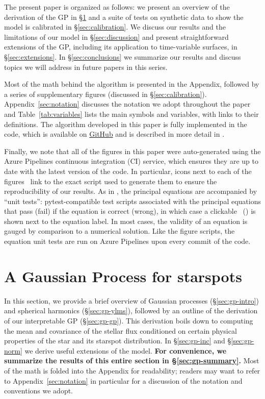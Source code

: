 \documentclass[modern,linenumbers]{aastex62}
\begin{document}
\vspace{1em}

The present paper is organized as follows:
we present an overview of the derivation of the GP in \S\ref{sec:gp}
and a suite of tests on synthetic data to show the model is calibrated
in \S\ref{sec:calibration}. We discuss our results and the limitations
of our model in \S\ref{sec:discussion} and present straightforward
extensions of the GP, including its application to time-variable
surfaces, in \S\ref{sec:extensions}.
In \S\ref{sec:conclusions} we summarize our results and discuss
topics we will address in future papers in this series.


Most of the math behind the algorithm
is presented in the Appendix, followed by a series of supplementary figures
(discussed in \S\ref{sec:calibration}). Appendix~\ref{sec:notation} discusses the
notation we adopt throughout the paper and Table~\ref{tab:variables}
lists the main symbols and variables, with links to their definitions.
The algorithm developed in this paper is fully implemented in the \starryprocess code, which is
available on \href{https://github.com/rodluger/starry_process}{GitHub}
and is described in more detail in \citet{JOSSPaper}.
%

Finally, we note that all of the figures in this paper were auto-generated
using the Azure Pipelines continuous integration (CI) service, which
ensures they are up to date with the latest version of the
\starryprocess code. In particular, icons next to each of the figures \codeicon \,
link to the exact script used to generate them to ensure the reproducibility
of our results. As in , the principal equations are
accompanied by
``unit tests'': \textsf{pytest}-compatible test scripts associated
with the principal equations that pass (fail) if the equation is correct (wrong),
in which case a clickable \testpassicon \, (\testfailicon) is shown next to the equation
label.
In most cases, the validity of an equation is gauged by comparison to
a numerical solution. Like the figure scripts, the equation unit tests are
run on Azure Pipelines upon every commit of the code.

\section{A Gaussian Process for starspots}
\label{sec:gp}

In this section, we provide a brief overview of Gaussian processes
(\S\ref{sec:gp-intro}) and spherical harmonics (\S\ref{sec:gp-ylms}),
followed by an outline of the derivation of our interpretable GP
(\S\ref{sec:gp-gp}).
This derivation boils down to computing the mean and covariance of the stellar
flux conditioned on certain physical properties of the star and its starspot
distribution.
In \S\ref{sec:gp-inc} and \S\ref{sec:gp-norm} we derive useful extensions
of the model. \textbf{For convenience, we summarize the results of this entire section in
    \S\ref{sec:gp-summary}.}
Most of the math is folded into the Appendix for readability;
readers may want to refer to Appendix~\ref{sec:notation} in particular for
a discussion of the notation and conventions we adopt.
\end{document}
